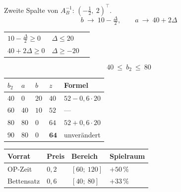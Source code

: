 \begin{merksatz}
Zweite Spalte von $A_B^{-1}$: $\left(-\tfrac12,\ 2\right)^{\!\top}$.
\[ b \ \to\ 10 - \tfrac{\Delta}{2}, \qquad a \ \to\ 40 + 2\Delta \]

\begin{center}
\renewcommand{\arraystretch}{1.5}
\begin{tabular}{@{}P{2.8cm}P{2.6cm}P{2.4cm}@{}}
\toprule
$10-\tfrac{\Delta}{2} \ge 0$ & $\Delta \le 20$ & \\
$40+2\Delta \ge 0$ & $\Delta \ge -20$ & \\
\bottomrule
\end{tabular}
\end{center}

\[ \boxed{\ 40 \ \le\ b_2 \ \le\ 80\ } \]

\begin{center}
{\small
\renewcommand{\arraystretch}{1.48}
\begin{tabular}{@{}P{1.4cm}P{1.4cm}P{1.4cm}P{1.6cm}P{2.2cm}@{}}
\toprule
$b_2$ & $a$ & $b$ & $z$ & \textbf{Formel}\\
\midrule
$40$ & $0$ & $20$ & $40$ & $52-0{,}6\cdot20$\\
$60$ & $40$ & $10$ & $52$ & ---\\
$80$ & $80$ & $0$ & $64$ & $52+0{,}6\cdot20$\\
$90$ & $80$ & $0$ & $\mathbf{64}$ & \textcolor{akzent}{unverändert}\\
\bottomrule
\end{tabular}}
\end{center}

\begin{center}
\renewcommand{\arraystretch}{1.48}
\begin{tabular}{@{}P{2.4cm}P{1.6cm}P{2.2cm}P{2.0cm}@{}}
\toprule
\textbf{Vorrat} & \textbf{Preis} & \textbf{Bereich} & \textbf{Spielraum}\\
\midrule
OP-Zeit & $0{,}2$ & $[60;\ 120]$ & $+50\,\%$\\
Bettensatz & $0{,}6$ & $[40;\ 80]$ & $+33\,\%$\\
\bottomrule
\end{tabular}
\end{center}

\begin{center}
\begin{minipage}{0.88\textwidth}
\end{minipage}
\end{center}
\end{merksatz}

